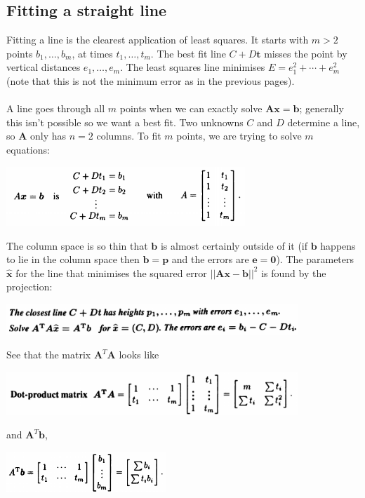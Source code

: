 \documentclass{report}
\begin{document}
\subsection{Fitting a straight line}
Fitting a line is the clearest application of least squares. It starts with $m>2$ points $b_1,\ldots,b_m$, at times $t_1,\ldots,t_m$.
The best fit line $C+D\bm t$ misses the point by vertical distances $e_1,\ldots,e_m$. The least squares line minimises $E=e_1^2+\cdots+e_m^2$ 
(note that this is not the minimum error as in the previous pages).\\
\vspace{1mm}\\
A line goes through all $m$ points when we can exactly solve $\bm{Ax}=\bm b$; generally this isn't possible so we want a best fit. 
Two unknowns $C$ and $D$ determine a line, so $\bm A$ only has $n=2$ columns. To fit $m$ points, we are trying to solve $m$ equations:
\begin{center}
\includegraphics[width=9cm]{74}
\end{center}
The column space is so thin that $\bm b$ is almost certainly outside of it (if $\bm b$ happens to lie in the column space then $\bm b=\bm p$ and the errors are 
$\bm e=\bm 0$). The parameters $\hat{\bm x}$ for the line that minimises the squared error $||\bm{Ax}-\bm b||^2$ is found by the projection:
\begin{center}
\includegraphics[width=11cm]{75}
\end{center}
See that the matrix $\bm A^T\bm A$ looks like
\begin{center}
\includegraphics[width=11cm]{76}
\end{center}
and $\bm A^T\bm b$,
\begin{center}
\includegraphics[width=6cm]{77}
\end{center}
\end{document}
